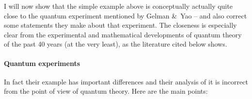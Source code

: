\documentclass[\ifafour a4paper,12pt,\else a5paper,10pt,\fi%
onecolumn,oneside,article,%
british%
]{memoir}
\theoremstyle{remark}
\theoremstyle{innote}
\newcommand*{\amp}{\&}
\renewcommand*{\|}[1][]{\nonscript\,#1\vert\nonscript\;\mathopen{}}
\begin{document}
I will now show that the simple example above is conceptually actually
quite close to the quantum experiment mentioned by Gelman \amp\ Yao -- and
also correct some statements they make about that experiment. The closeness
is especially clear from the experimental and mathematical developments of
quantum theory of the past 40 years (at the very least), as the literature
cited below shows.

\bigskip

\paragraph{Quantum experiments}

In fact their
example has important differences and their analysis of it is incorrect
from the point of view of quantum theory. Here are the main points:
\end{document}
